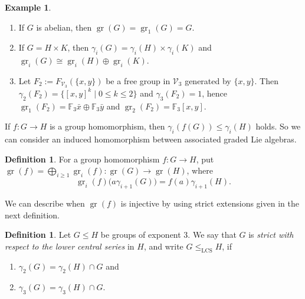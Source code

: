 \documentclass[11pt,reqno]{article}
\theoremstyle{definition}
\newtheorem{definition}[theorem]{Definition}
\newtheorem{example}[theorem]{Example}
\theoremstyle{remark}
\DeclareMathOperator{\gr}{gr}
\newcommand{\LCS}{\mathrm{LCS}}
\begin{document}
\begin{example}
    \begin{enumerate}
        \item If $G$ is abelian, then $\gr(G)=\gr_1(G)=G$.
        \item If $G=H\times K$, then $\gamma_i(G)=\gamma_i(H)\times \gamma_i(K)$ and $\gr_i(G)\cong \gr_i(H)\oplus \gr_i(K)$.
        \item Let $F_2:= F_{\mathcal V_3}(\{x,y\})$ be a free group in $\mathcal V_3$ generated by $\{x,y\}$. Then $\gamma_2(F_2)=\{[x,y]^k\mid 0\leq k\leq 2\}$ and $\gamma_3(F_2)=1$, hence $\gr_1(F_2)=\mathbb F_3\bar x\oplus \mathbb F_3\bar y$ and $\gr_2(F_2)=\mathbb F_3 [x, y]$.
    \end{enumerate}
\end{example}

If $f:G\to H$ is a group homomorphism, then $\gamma_i(f(G))\leq \gamma_i(H)$ holds.
So we can consider an induced homomorphism between associated graded Lie algebras.
\begin{definition}
    For a group homomorphism $f:G\to H$, put
    $\gr(f)=\bigoplus_{i\geq1}\gr_i(f):\gr(G)\to\gr(H)$, where
    \[
    \gr_i(f)\bigl(a\gamma_{i+1}(G)\bigr)
    =f(a)\gamma_{i+1}(H).
    \]
\end{definition}

We can describe when $\gr(f)$ is injective by using strict extensions given in the next definition.

\begin{definition}
    Let $G\leq H$ be groups of exponent $3$.
    We say that $G$ is \emph{strict with respect to the lower central series}
    in $H$, and write $G\leq_{\LCS}H$, if
    \begin{enumerate}
        \item $\gamma_2(G)=\gamma_2(H)\cap G$ and
        \item $\gamma_3(G)=\gamma_3(H)\cap G$.
    \end{enumerate}
\end{definition}
\end{document}
